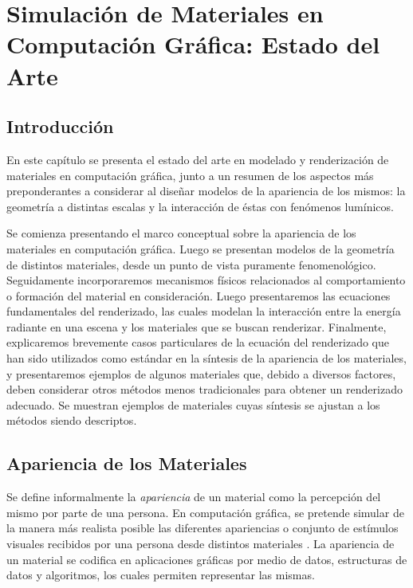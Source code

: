 
\chapter[Estado del Arte]{Simulación de Materiales en Computación Gráfica: Estado del Arte}
\section{Introducción} %

En este capítulo se presenta el estado del arte en modelado y renderización de materiales en computación gráfica, junto a un resumen de los aspectos más preponderantes a considerar al diseñar modelos de la apariencia de los mismos: la geometría a distintas escalas y la interacción de éstas con fenómenos lumínicos.

Se comienza presentando el marco conceptual sobre la apariencia de los materiales en computación gráfica.
Luego se presentan modelos de la geometría de distintos materiales, desde un punto de vista puramente fenomenológico.
Seguidamente incorporaremos mecanismos físicos relacionados al comportamiento o formación del material en consideración.
Luego presentaremos las ecuaciones fundamentales del renderizado, las cuales modelan la interacción entre la energía radiante en una escena y los materiales que se buscan renderizar.
Finalmente, explicaremos brevemente casos particulares de la ecuación del renderizado que han sido utilizados como estándar en la síntesis de la apariencia de los materiales, y presentaremos ejemplos de algunos materiales que, debido a diversos factores, deben considerar otros métodos menos tradicionales para obtener un renderizado adecuado.
Se muestran ejemplos de materiales cuyas síntesis se ajustan a los métodos 
siendo descriptos.

\section{Apariencia de los Materiales}
Se define informalmente la {\em apariencia} de un material como la percepción del mismo por parte de una persona.
En computación gráfica, se pretende simular de la manera más realista posible las diferentes apariencias o conjunto de estímulos visuales recibidos por una persona desde distintos materiales	.
La apariencia de un material se codifica en aplicaciones gráficas por medio de datos, estructuras de datos y algoritmos, los cuales permiten representar las mismas.

